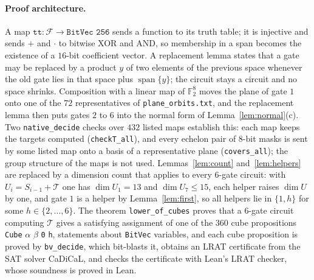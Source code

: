 \documentclass[11pt,a4paper]{article}
\theoremstyle{definition}
\newcommand{\F}{\mathbb{F}}
\newcommand{\Fn}{\mathcal{F}}
\newcommand{\Tg}{\mathcal{T}}
\newcommand{\spn}{\operatorname{span}}
\newcommand{\code}[1]{\texttt{#1}}
\begin{document}
\paragraph{Proof architecture.} A map $\code{tt}:\Fn\to\code{BitVec 256}$ sends a function to its truth table; it is injective and sends $+$ and $\cdot$ to bitwise XOR and AND, so membership in a span becomes the existence of a $16$-bit coefficient vector. A replacement lemma states that a gate may be replaced by a product $y$ of two elements of the previous space whenever the old gate lies in that space plus $\spn\{y\}$; the circuit stays a circuit and no space shrinks. Composition with a linear map of $\F_2^8$ moves the plane of gate $1$ onto one of the $72$ representatives of \code{plane\_orbits.txt}, and the replacement lemma then puts gates $2$ to $6$ into the normal form of Lemma~\ref{lem:normal}(c). Two \code{native\_decide} checks over $432$ listed maps establish this: each map keeps the targets computed (\code{checkT\_all}), and every echelon pair of $8$-bit masks is sent by some listed map onto a basis of a representative plane (\code{covers\_all}); the group structure of the maps is not used. Lemmas~\ref{lem:count} and~\ref{lem:helpers} are replaced by a dimension count that applies to every $6$-gate circuit: with $U_i=S_{i-1}+\Tg$ one has $\dim U_1=13$ and $\dim U_7\le15$, each helper raises $\dim U$ by one, and gate $1$ is a helper by Lemma~\ref{lem:first}, so all helpers lie in $\{1,h\}$ for some $h\in\{2,\dots,6\}$. The theorem \code{lower\_of\_cubes} proves that a $6$-gate circuit computing $\Tg$ gives a satisfying assignment of one of the $360$ cube propositions \code{Cube} $\alpha$ $\beta$ \code{0} \code{h}, statements about \code{BitVec} variables, and each cube proposition is proved by \code{bv\_decide}, which bit-blasts it, obtains an LRAT certificate from the SAT solver CaDiCaL, and checks the certificate with Lean's LRAT checker, whose soundness is proved in Lean.
\end{document}
